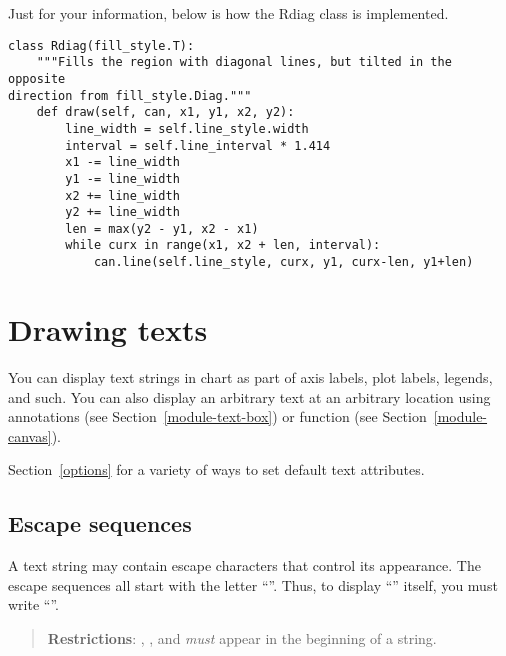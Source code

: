 \documentclass{howto}
\newcommand{\secref}[1]{Section~\ref{#1}}
\newcommand{\pxref}[1]{see Section~\ref{#1}}
\begin{document}
Just for your information, below is how the Rdiag class is implemented.

\begin{verbatim}
class Rdiag(fill_style.T):
    """Fills the region with diagonal lines, but tilted in the opposite
direction from fill_style.Diag."""
    def draw(self, can, x1, y1, x2, y2):
        line_width = self.line_style.width
        interval = self.line_interval * 1.414
        x1 -= line_width
        y1 -= line_width
        x2 += line_width
        y2 += line_width
        len = max(y2 - y1, x2 - x1)
        while curx in range(x1, x2 + len, interval):
            can.line(self.line_style, curx, y1, curx-len, y1+len)
\end{verbatim}

\section{Drawing texts}


You can display text strings in chart as part of axis labels, plot
labels, legends, and such. You can also display an arbitrary text at an
arbitrary location using annotations (\pxref{module-text-box}) or
 function (\pxref{module-canvas}).

\begin{seealso}
  \secref{options} for a variety of ways to set default text attributes.
\end{seealso}

\subsection{Escape sequences}\label{escape-sequence}

A text string may contain escape characters that control its
appearance.  The escape sequences all start with the letter
``\code{/}''. Thus, to display ``\code{/}'' itself, you must write
``\code{//}''.

\begin{quote}
\textbf{Restrictions}: , , and  \emph{must}
appear in the beginning of a string.
\end{quote}

\index{/}

\end{document}

